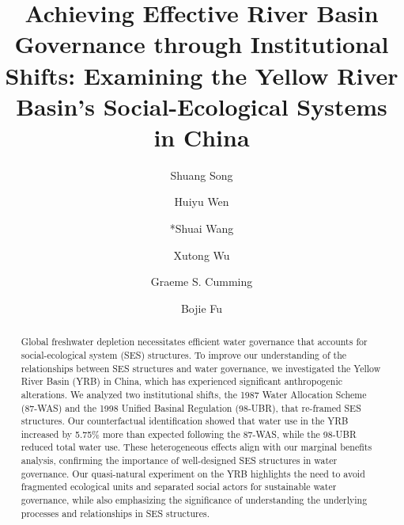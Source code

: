 \documentclass[preprint, 12pt]{elsarticle}
\begin{document}
\begin{frontmatter}

% 
\title{Achieving Effective River Basin Governance through Institutional Shifts: Examining the Yellow River Basin's Social-Ecological Systems in China}


\author[inst1]{Shuang Song}
\author[inst2]{Huiyu Wen}
\author[inst1]{*Shuai Wang}
\author[inst1]{Xutong Wu}

\author[inst3]{Graeme S. Cumming}
\author[inst1]{Bojie Fu}







\begin{abstract}
     Global freshwater depletion necessitates efficient water governance that accounts for social-ecological system (SES) structures. To improve our understanding of the relationships between SES structures and water governance, we investigated the Yellow River Basin (YRB) in China, which has experienced significant anthropogenic alterations. We analyzed two institutional shifts, the 1987 Water Allocation Scheme (87-WAS) and the 1998 Unified Basinal Regulation (98-UBR), that re-framed SES structures. Our counterfactual identification showed that water use in the YRB increased by 5.75\% more than expected following the 87-WAS, while the 98-UBR reduced total water use. These heterogeneous effects align with our marginal benefits analysis, confirming the importance of well-designed SES structures in water governance. Our quasi-natural experiment on the YRB highlights the need to avoid fragmented ecological units and separated social actors for sustainable water governance, while also emphasizing the significance of understanding the underlying processes and relationships in SES structures.
\end{abstract}



\end{frontmatter}
\end{document}
